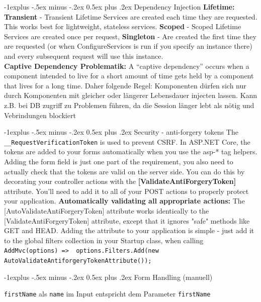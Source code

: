 \documentclass[a4paper, fontsize=6pt]{scrartcl}
\makeatletter
\renewcommand{\subsection}{\@startsection{subsection}{2}{0mm}%
    {-1explus -.5ex minus -.2ex}%
    {0.5ex plus .2ex}%
    {\normalfont\normalsize\bfseries}}
\newcommand{\html}[1]{\texttt{#1}}
\newcommand{\csharp}[1]{\texttt{#1}}
\makeatother
\begin{document}
\begin{multicols*}{5}
\subsection{Dependency Injection}
\textbf{Lifetime:} \textbf{Transient} - Transient Lifetime Services are created each time they are requested. This works best for lightweight, stateless services. \textbf{Scoped} - Scoped Lifetime Services are created once per request, \textbf{Singleton} - Are created the first time they are requested (or when ConfigureServices is run if you specify an instance there) and every subsequent request will use this instance.\\
\textbf{Captive Dependency Problematik:} A “captive dependency” occurs when a component intended to live for a short amount of time gets held by a component that lives for a long time. Daher folgende Regel: Komponenten dürfen sich nur durch Komponenten mit gleicher oder längerer Lebensdauer injecten lassen. Kann z.B. bei DB zugriff zu Problemen führen, da die Session länger lebt als nötig und Vebrindungen blockiert

\subsection{Security - anti-forgery tokens}
The \texttt{\_\_RequestVerificationToken} is used to prevent CSRF. In ASP.NET Core, the tokens are added to your forms automatically when you use the asp-* tag helpers. Adding the form field is just one part of the requirement, you also need to actually check that the tokens are valid on the server side. You can do this by decorating your controller actions with the \textbf{[ValidateAntiForgeryToken]} attribute. You'll need to add it to all of your POST actions to properly protect your application. \textbf{Automatically validating all appropriate actions:} The [AutoValidateAntiForgeryToken] attribute works identically to the [ValidateAntiForgeryToken] attribute, except that it ignores "safe" methods like GET and HEAD. Adding the attribute to your application is simple - just add it to the global filters collection in your Startup class, when calling \csharp{AddMvc(options) => { options.Filters.Add(new AutoValidateAntiforgeryTokenAttribute()); }}

\subsection{Form Handling (manuell)}

\html{firstName} als \html{name} im Input entspricht dem Parameter \csharp{firstName}


\end{multicols*}
\end{document}
